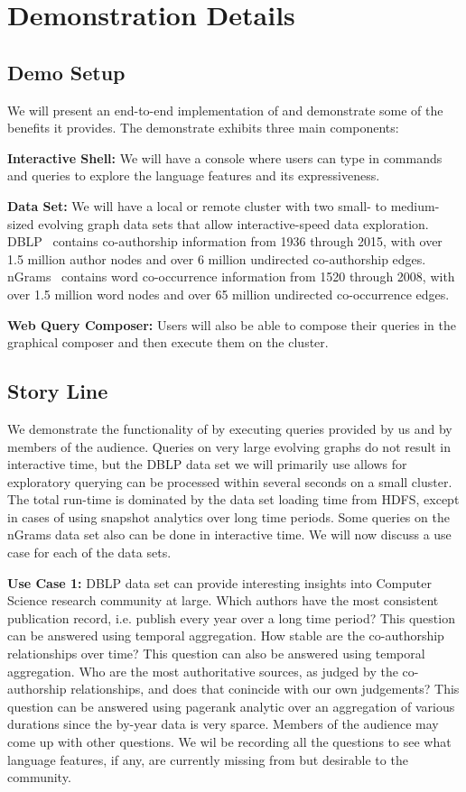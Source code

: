 \section{Demonstration Details}
\label{sec:demo}

\subsection{Demo Setup}
\label{sec:setup}

We will present an end-to-end implementation of \ql and demonstrate
some of the benefits it provides.  The demonstrate exhibits three main
components:

{\bf Interactive Shell:} We will have a console where users can type
in \ql commands and queries to explore the language features and its
expressiveness.  

{\bf Data Set:} We will have a local or remote
cluster with two small- to medium-sized evolving graph data sets that
allow interactive-speed data exploration.  DBLP~\cite{dblp} contains
co-authorship information from 1936 through 2015, with over 1.5
million author nodes and over 6 million undirected co-authorship
edges.  nGrams~\cite{nGrams} contains word co-occurrence information
from 1520 through 2008, with over 1.5 million word nodes and over 65
million undirected co-occurrence edges.

{\bf Web Query Composer:} Users will also be able to compose their
queries in the graphical composer and then execute them on the
cluster.

\subsection{Story Line}
\label{sec:story}

We demonstrate the functionality of \ql by executing queries provided
by us and by members of the audience.  Queries on very large evolving
graphs do not result in interactive time, but the DBLP data set we
will primarily use allows for exploratory querying can be processed
within several seconds on a small cluster.  The total run-time is
dominated by the data set loading time from HDFS, except in cases of
using snapshot analytics over long time periods. Some queries on the
nGrams data set also can be done in interactive time.  We will now
discuss a use case for each of the data sets.

{\bf Use Case 1:} DBLP data set can provide interesting insights into
Computer Science research community at large.  Which authors have the
most consistent publication record, i.e. publish every year over a
long time period? This question can be answered using temporal
aggregation.  How stable are the co-authorship relationships over
time? This question can also be answered using temporal aggregation.
Who are the most authoritative sources, as judged by the co-authorship
relationships, and does that conincide with our own judgements?  This
question can be answered using pagerank analytic over an aggregation
of various durations since the by-year data is very sparce.  Members
of the audience may come up with other questions.  We wil be recording
all the questions to see what language features, if any, are currently
missing from \ql but desirable to the community.

